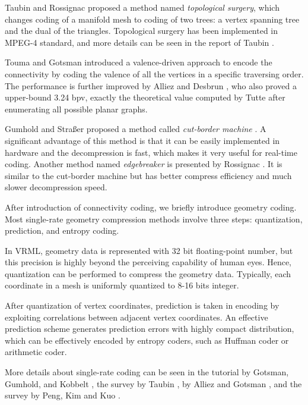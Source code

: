     Taubin and Rossignac \cite{274365} proposed a method named
    \emph{topological surgery}, which changes coding of a manifold
    mesh to coding of two trees: a vertex spanning tree and the dual of the triangles.
    Topological surgery has been implemented in MPEG-4 standard, and more details
    can be seen in the report of Taubin \cite{3d:Taubin}.
    
    Touma and Gotsman \cite{triangle:Touma} introduced a
    valence-driven approach to encode the connectivity by coding the
    valence of all the vertices in a specific traversing order. 
    The performance is further improved
    by Alliez and Desbrun \cite{alliez01valencedriven}, who also proved a
    upper-bound 3.24 bpv, exactly the theoretical value computed
    by Tutte \cite{census:Tutte} after enumerating all possible planar
    graphs.

    Gumhold and Stra\ss{}er proposed a method called \emph{cut-border machine} \cite{280836}.
    A significant advantage of this method is that it can be easily implemented
    in hardware and the decompression is fast, which
    makes it very useful for real-time coding. 
    Another method named \emph{edgebreaker} is presented by Rossignac \cite{614421}.
    It is similar to the cut-border machine but has better
    compress efficiency and much slower decompression speed.
    
    After introduction of connectivity coding, we briefly introduce geometry
    coding. Most single-rate geometry compression methods involve three steps:
    quantization, prediction, and entropy coding.

    In VRML, geometry data is represented with 32 bit floating-point
    number, but this precision is highly beyond the perceiving
    capability of human eyes. Hence, quantization can be performed to
    compress the geometry data. Typically, each coordinate in a mesh is
    uniformly quantized to 8-16 bits integer.

    After quantization of vertex coordinates, prediction is taken in
    encoding by exploiting correlations between adjacent vertex
    coordinates. An effective prediction scheme generates prediction
    errors with highly compact distribution, which can be effectively
    encoded by entropy coders, such as Huffman coder or arithmetic
    coder. 

    More details about single-rate coding can be seen in the tutorial
    by Gotsman, Gumhold, and Kobbelt \cite{gotsman-simplification},
    the survey by Taubin \cite{3d:Taubin}, by Alliez and Gotsman
    \cite{recent:alliez}, and the survey by Peng, Kim and Kuo
    \cite{technologies:peng}.
    
